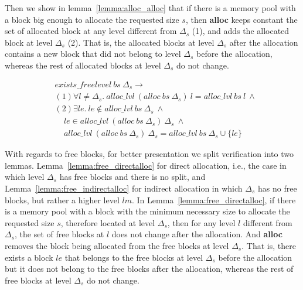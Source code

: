 Then we show in lemma~\ref{lemma:alloc_alloc} that if there is a memory pool with a block big enough to allocate the requested size $s$, then \textbf{alloc} keeps constant the set of allocated block at any level different from $\Delta_s$ (1), and adds the allocated block at level $\Delta_s$ (2). That is, the allocated blocks at level $\Delta_s$ after the allocation contains a new block that did not belong to level $\Delta_s$ before the allocation, whereas the rest of allocated blocks at level $\Delta_s$ do not change.

\begin{lemma} 
\label{lemma:alloc_alloc}
\begin{align*}
&exists\_freelevel\ bs\  \Delta_s \longrightarrow \\
&(1)\forall l \ne \Delta_s.\ alloc\_lvl\ (alloc\ bs\ \Delta_s)\ l = alloc\_lvl\ bs\ l\ \wedge\\
&(2)\exists le.\ le \notin alloc\_lvl\ bs\ \Delta_s\ \wedge\\
&\ \ \ \ \ le \in alloc\_lvl\ (alloc\ bs\ \Delta_s)\ \Delta_s\ \wedge\\
&\ \ \ \ \ alloc\_lvl\ (alloc\ bs\ \Delta_s)\ \Delta_s = alloc\_lvl\ bs\ \Delta_s \cup \lbrace le \rbrace
\end{align*}
\end{lemma}

With regards to free blocks, for better presentation we split verification into two lemmas. Lemma~\ref{lemma:free_directalloc} for direct allocation, i.e., the case in which level $\Delta_s$ has free blocks and there is no split, and Lemma~\ref{lemma:free_indirectalloc} for indirect allocation in which $\Delta_s$ has no free blocks, but rather a higher level $lm$. In Lemma~\ref{lemma:free_directalloc}, if there is a memory pool with a block with the minimum necessary size to allocate the requested size $s$, therefore located at level $\Delta_s$, then for any level $l$ different from $\Delta_s$, the set of free blocks at $l$ does not change after the allocation. And \textbf{alloc} removes the block being allocated from the free blocks at level $\Delta_s$. That is, there exists a block $le$ that belongs to the free blocks at level $\Delta_s$ before the allocation but it does not belong to the free blocks after the allocation, whereas the rest of free blocks at level $\Delta_s$ do not change.

